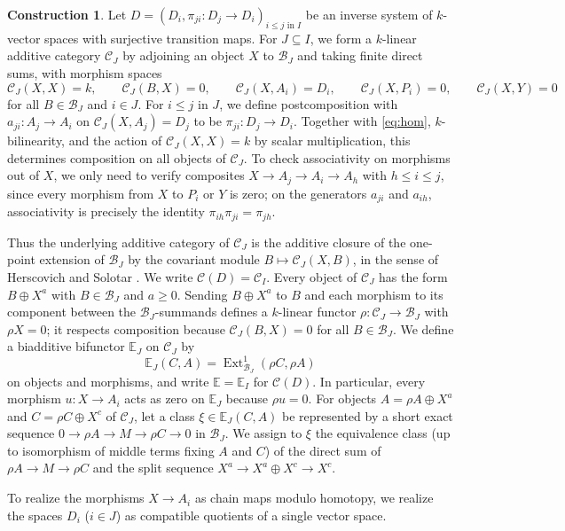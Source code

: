 \documentclass[a4paper,reqno,10pt]{amsart}
\numberwithin{equation}{section}
\theoremstyle{definition}
\newtheorem{construction}[theorem]{Construction}
\newcommand{\B}{\mathcal B}
\newcommand{\C}{\mathcal C}
\newcommand{\E}{\mathbb E}
\DeclareMathOperator{\Ext}{Ext}
\begin{document}
\begin{construction}\label{con:category}
Let $D=(D_i,\pi_{ji}:D_j\to D_i)_{i\leq j\text{ in }I}$ be an inverse system of
$k$-vector spaces with surjective transition maps. For $J\subseteq I$, we form
a $k$-linear additive category $\C_J$ by adjoining an object $X$ to $\B_J$ and
taking finite direct sums, with morphism spaces
\begin{equation}\label{eq:X}
  \C_J(X,X)=k,\qquad \C_J(B,X)=0,\qquad
  \C_J(X,A_i)=D_i,\qquad \C_J(X,P_i)=0,\qquad \C_J(X,Y)=0
\end{equation}
for all $B\in\B_J$ and $i\in J$. For $i\le j$ in $J$, we define postcomposition
with $a_{ji}:A_j\to A_i$ on $\C_J(X,A_j)=D_j$ to be $\pi_{ji}:D_j\to D_i$.
Together with \eqref{eq:hom}, $k$-bilinearity, and the action of
$\C_J(X,X)=k$ by scalar multiplication, this determines composition on all
objects of $\C_J$. To check associativity on morphisms out of $X$, we only need
to verify composites $X\to A_j\to A_i\to A_h$ with $h\le i\le j$, since every
morphism from $X$ to $P_i$ or $Y$ is zero; on the generators $a_{ji}$ and
$a_{ih}$, associativity is precisely the identity $\pi_{ih}\pi_{ji}=\pi_{jh}$.

Thus the underlying additive category of $\C_J$ is the additive closure of the
one-point extension of $\B_J$ by the covariant module $B\mapsto\C_J(X,B)$, in
the sense of Herscovich and Solotar \cite[\S3]{HeS}. We write $\C(D)=\C_I$.
Every object of $\C_J$ has the form $B\oplus X^a$ with $B\in\B_J$ and
$a\ge 0$. Sending $B\oplus X^a$ to $B$ and each morphism to its component
between the $\B_J$-summands defines a $k$-linear functor $\rho:\C_J\to\B_J$
with $\rho X=0$; it respects composition because $\C_J(B,X)=0$ for all
$B\in\B_J$. We define a biadditive bifunctor $\E_J$ on $\C_J$ by
\[
    \E_J(C,A)=\Ext^1_{\B_J}(\rho C,\rho A)
\]
on objects and morphisms, and write $\E=\E_I$ for $\C(D)$. In particular, every
morphism $u:X\to A_i$ acts as zero on $\E_J$ because $\rho u=0$. For objects
$A=\rho A\oplus X^a$ and $C=\rho C\oplus X^c$ of $\C_J$, let a class
$\xi\in\E_J(C,A)$ be represented by a short exact sequence
$0\to\rho A\to M\to\rho C\to0$ in $\B_J$. We assign to $\xi$ the equivalence
class (up to isomorphism of middle terms fixing $A$ and $C$) of the direct sum
of $\rho A\to M\to\rho C$ and the split sequence
$X^a\to X^a\oplus X^c\to X^c$.
\end{construction}

To realize the morphisms $X\to A_i$ as chain maps modulo homotopy, we realize
the spaces $D_i$ ($i\in J$) as compatible quotients of a single vector space.
\end{document}
